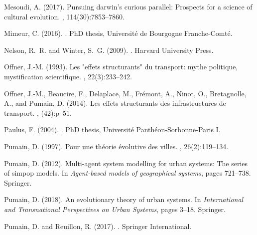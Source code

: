 \documentclass[11pt]{article}
\begin{document}
\begin{thebibliography}{}
Mesoudi, A. (2017).
\newblock Pursuing darwin's curious parallel: Prospects for a science of
  cultural evolution.
,
  114(30):7853--7860.

Mimeur, C. (2016).
.
\newblock PhD thesis, {Universit{\'e} de Bourgogne Franche-Comt{\'e}}.

Nelson, R.~R. and Winter, S.~G. (2009).
.
\newblock Harvard University Press.

Offner, J.-M. (1993).
\newblock Les "effets structurants" du transport: mythe politique,
  mystification scientifique.
, 22(3):233--242.

Offner, J.-M., Beaucire, F., Delaplace, M., Fr{\'e}mont, A., Ninot, O.,
  Bretagnolle, A., and Pumain, D. (2014).
\newblock Les effets structurants des infrastructures de transport.
, (42):p--51.

Paulus, F. (2004).
.
\newblock PhD thesis, Universit{\'e} Panth{\'e}on-Sorbonne-Paris I.

Pumain, D. (1997).
\newblock Pour une th{\'e}orie {\'e}volutive des villes.
, 26(2):119--134.

Pumain, D. (2012).
\newblock Multi-agent system modelling for urban systems: The series of simpop
  models.
\newblock In {\em Agent-based models of geographical systems}, pages 721--738.
  Springer.

Pumain, D. (2018).
\newblock An evolutionary theory of urban systems.
\newblock In {\em International and Transnational Perspectives on Urban
  Systems}, pages 3--18. Springer.

Pumain, D. and Reuillon, R. (2017).
.
\newblock Springer International.


\end{thebibliography}
\end{document}
